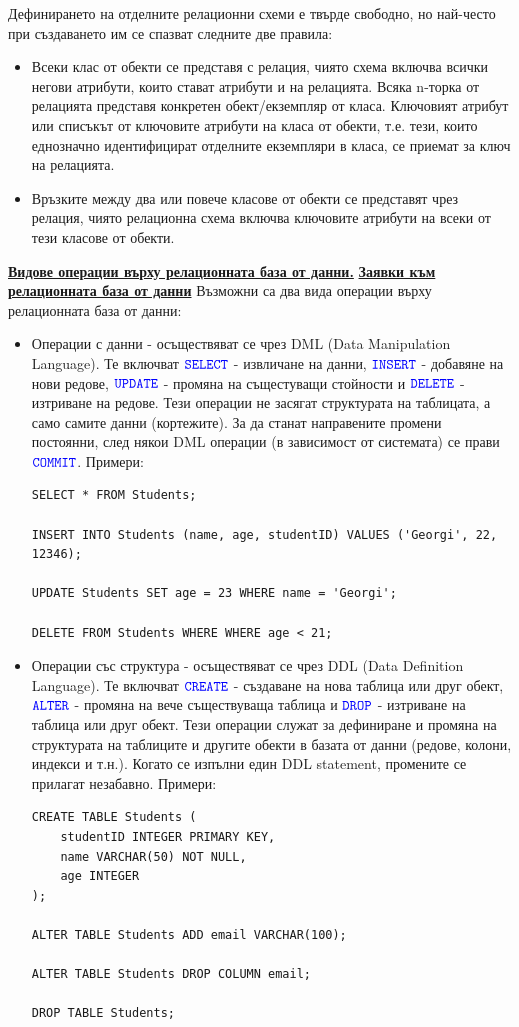\documentclass{article}
\newcommand{\sqlkw}[1]{\textcolor{blue}{\texttt{#1}}}
\begin{document}
Дефинирането на отделните релационни схеми е твърде свободно, но най-често при създаването им се спазват следните две правила:
\begin{itemize}
    \item Всеки клас от обекти се представя с релация, чиято схема включва всички негови атрибути, които стават атрибути и на релацията.
    Всяка n-торка от релацията представя конкретен обект/екземпляр от класа. Ключовият атрибут или списъкът от ключовите атрибути на класа
    от обекти, т.е. тези, които еднозначно идентифицират отделните екземпляри в класа, се приемат за ключ на релацията.
    \item Връзките между два или повече класове от обекти се представят чрез релация, чиято релационна схема включва ключовите атрибути на
    всеки от тези класове от обекти.
\end{itemize}
\textbf{\underline{Видове операции върху релационната база от данни.}} \newline
\textbf{\underline{Заявки към релационната база от данни}} \newline\newline
Възможни са два вида операции върху релационната база от данни:
\begin{itemize}
    \item Операции с данни - осъществяват се чрез DML (Data Manipulation Language). Те включват $\sqlkw{SELECT}$ - извличане на данни, $\sqlkw{INSERT}$ - добавяне
    на нови редове, $\sqlkw{UPDATE}$ - промяна на същестуващи стойности и $\sqlkw{DELETE}$ - изтриване на редове. Тези операции не засягат структурата на таблицата,
    а само самите данни (кортежите). За да станат направените промени постоянни, след някои DML операции (в зависимост от системата) се прави $\sqlkw{COMMIT}$.
    Примери:
\begin{lstlisting}[style=sql]
SELECT * FROM Students;

INSERT INTO Students (name, age, studentID) VALUES ('Georgi', 22, 12346);

UPDATE Students SET age = 23 WHERE name = 'Georgi';

DELETE FROM Students WHERE WHERE age < 21;
\end{lstlisting}
    \item Операции със структура - осъществяват се чрез DDL (Data Definition Language). Те включват $\sqlkw{CREATE}$ - създаване на нова таблица или друг
    обект, $\sqlkw{ALTER}$ - промяна на вече съществуваща таблица и $\sqlkw{DROP}$ - изтриване на таблица или друг обект. Тези операции служат за дефиниране и
    промяна на структурата на таблиците и другите обекти в базата от данни (редове, колони, индекси и т.н.). Когато се изпълни един DDL statement,
    промените се прилагат незабавно. Примери:
\begin{lstlisting}[style=sql]
CREATE TABLE Students (
    studentID INTEGER PRIMARY KEY,
    name VARCHAR(50) NOT NULL,
    age INTEGER
);

ALTER TABLE Students ADD email VARCHAR(100);

ALTER TABLE Students DROP COLUMN email;

DROP TABLE Students;
\end{lstlisting}
\end{itemize}
\end{document}
